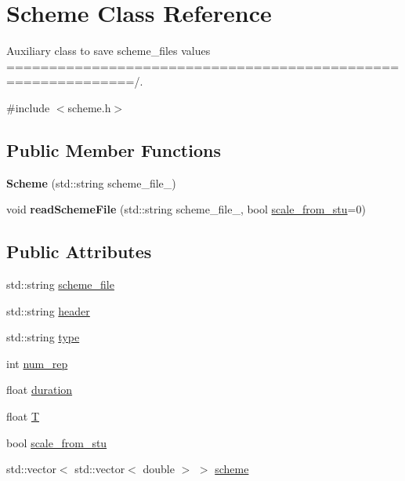 \hypertarget{class_scheme}{}\section{Scheme Class Reference}
\label{class_scheme}


Auxiliary class to save scheme\+\_\+files values =============================================================/.  




{\ttfamily \#include $<$scheme.\+h$>$}

\subsection*{Public Member Functions}
\begin{DoxyCompactItemize}
\item 
\mbox{\label{class_scheme_a932eafa378988202a457037db3846aac}} 
{\bfseries Scheme} (std\+::string scheme\+\_\+file\+\_\+)
\item 
\mbox{\label{class_scheme_a6c117cd4fa744d12abecb9184df30356}} 
void {\bfseries read\+Scheme\+File} (std\+::string scheme\+\_\+file\+\_\+, bool \hyperlink{class_scheme_ac66ecb38621208f8dd1b5334919316cf}{scale\+\_\+from\+\_\+stu}=0)
\end{DoxyCompactItemize}
\subsection*{Public Attributes}
\begin{DoxyCompactItemize}
\item 
std\+::string \hyperlink{class_scheme_afa0549aa16f4f6c62d6c397909be3350}{scheme\+\_\+file}
\item 
std\+::string \hyperlink{class_scheme_a276a907de6afa60b6826552f337e310b}{header}
\item 
std\+::string \hyperlink{class_scheme_a3a767ed00f8859a04857812e370c6db5}{type}
\item 
int \hyperlink{class_scheme_ae41c5ea2b3aab4492f95b2479945b729}{num\+\_\+rep}
\item 
float \hyperlink{class_scheme_ae2b4a7f1d0f06f4bea2a7f2761cbe2a7}{duration}
\item 
float \hyperlink{class_scheme_a9715a33d087d317724e96229572ebe0d}{T}
\item 
bool \hyperlink{class_scheme_ac66ecb38621208f8dd1b5334919316cf}{scale\+\_\+from\+\_\+stu}
\item 
std\+::vector$<$ std\+::vector$<$ double $>$ $>$ \hyperlink{class_scheme_aa0d26e624075fbac339a746ed10b2dc0}{scheme}
\end{DoxyCompactItemize}


